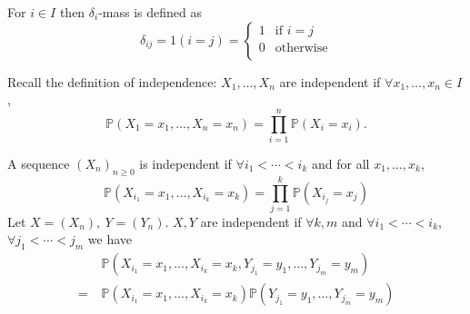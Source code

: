 \documentclass[a4paper]{article}
\begin{document}
\begin{definition}
    For $i\in I$ then $ \delta_i $-mass is defined as 
    \[
        \delta_{ij} = 1(i=j) = \begin{cases}
        1 &\text{if }i=j\\
        0 &\text{otherwise}\\
        \end{cases} 
    \]
\end{definition}
Recall the definition of independence: $ X_1,\dots,X_n $ are independent if $ \forall x_1,\dots,x_n\in I $, 
\[
    \mathbb{P}(X_1=x_1,\dots,X_n=x_n) = \prod_{i=1}^{n} \mathbb{P}(X_i=x_i).
\]
\begin{definition}
    A sequence $ (X_n)_{n\ge 0} $ is independent if $ \forall i_1<\cdots<i_k $ and for all $ x_1,\dots,x_k $, 
    \[
        \mathbb{P}(X_{i_1}=x_1,\dots,X_{i_k}=x_k) = \prod_{j=1}^{k}\mathbb{P}(X_{i_j}=x_j)
    \]
    Let $ X=(X_n),\ Y=(Y_n) $. $X,Y$ are independent if $ \forall k,m $ and $ \forall i_1<\cdots<i_k $, $ \forall j_1<\cdots<j_m $ we have 
    \begin{align*}
        &\mathbb{P}(X_{i_1}=x_1,\dots,X_{i_k}=x_k, Y_{j_1}=y_1,\dots,Y_{j_m}=y_m)\\
        =\;& \mathbb{P}(X_{i_1}=x_1,\dots,X_{i_k}=x_k) \mathbb{P}(Y_{j_1}=y_1,\dots,Y_{j_m}=y_m)
    \end{align*}
\end{definition}
\end{document}

